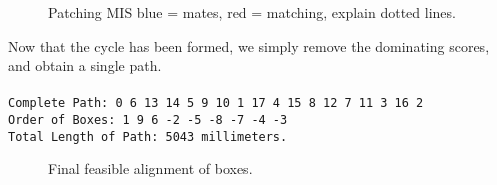 \documentclass[a4paper, 11pt, twoside, onecolumn, openany]{article}
\newcommand{\code}[1]{\colorbox{light-gray}{\texttt{#1}}}
\begin{document}
\begin{figure}[!htb]
	\centering
	
	\caption{Patching MIS blue = mates, red = matching, explain dotted lines.}
	\label{fig:patch}	
\end{figure}



Now that the cycle has been formed, we simply remove the dominating scores, and obtain a single path.\\
\\
\code{Complete Path: 0 6 13 14 5 9 10 1 17 4 15 8 12 7 11 3 16 2}\\
\code{Order of Boxes: 1 9 6 -2 -5 -8 -7 -4 -3}\\
\code{Total Length of Path: 5043 millimeters.}






\begin{figure}[!htb]
	\centering
	
	\caption{Final feasible alignment of boxes.}	
	\label{fig:path}
\end{figure}
\end{document}
